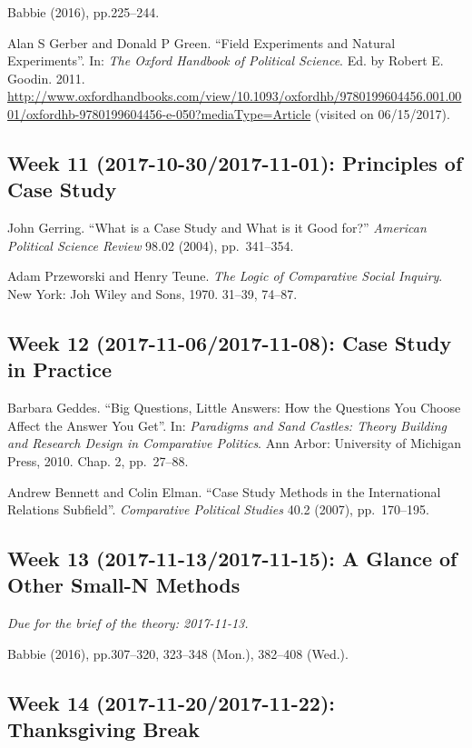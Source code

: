 \documentclass[11pt,]{article}
\theoremstyle{definition}
\theoremstyle{definition}
\theoremstyle{definition}
\theoremstyle{remark}
\begin{document}
Babbie (2016), pp.225--244.

Alan S Gerber and Donald P Green. ``Field Experiments and Natural
Experiments''. In: \emph{The Oxford Handbook of Political Science}. Ed.
by Robert E. Goodin. 2011.
\url{http://www.oxfordhandbooks.com/view/10.1093/oxfordhb/9780199604456.001.0001/oxfordhb-9780199604456-e-050?mediaType=Article}
(visited on 06/15/2017).

\subsection{Week 11 (2017-10-30/2017-11-01): Principles of Case
Study}\label{week-11-2017-10-302017-11-01-principles-of-case-study}

John Gerring. ``What is a Case Study and What is it Good for?''
\emph{American Political Science Review} 98.02 (2004), pp.~341--354.

Adam Przeworski and Henry Teune.
\emph{The Logic of Comparative Social Inquiry}. New York: Joh Wiley and
Sons, 1970. 31--39, 74--87.

\subsection{Week 12 (2017-11-06/2017-11-08): Case Study in
Practice}\label{week-12-2017-11-062017-11-08-case-study-in-practice}

Barbara Geddes. ``Big Questions, Little Answers: How the Questions You
Choose Affect the Answer You Get''. In:
\emph{Paradigms and Sand Castles: Theory Building and Research Design in Comparative Politics}.
Ann Arbor: University of Michigan Press, 2010. Chap. 2, pp.~27--88.

Andrew Bennett and Colin Elman. ``Case Study Methods in the
International Relations Subfield''. \emph{Comparative Political Studies}
40.2 (2007), pp.~170--195.

\subsection{Week 13 (2017-11-13/2017-11-15): A Glance of Other Small-N
Methods}\label{week-13-2017-11-132017-11-15-a-glance-of-other-small-n-methods}

\emph{Due for the brief of the theory: 2017-11-13.}

Babbie (2016), pp.307--320, 323--348 (Mon.), 382--408 (Wed.).

\subsection{Week 14 (2017-11-20/2017-11-22): Thanksgiving
Break}\label{week-14-2017-11-202017-11-22-thanksgiving-break}
\end{document}
